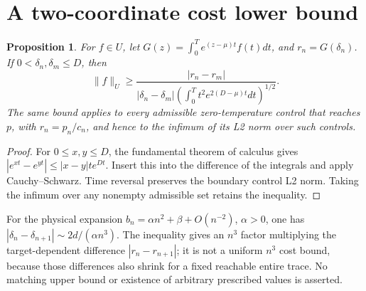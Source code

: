 \documentclass[11pt]{article}
\newtheorem{proposition}{Proposition}
\begin{document}
\section{A two-coordinate cost lower bound}
\begin{proposition}\label{prop:cost}
For \(f\in U\), let \(G(z)=\int_0^T e^{(z-\mu)t}f(t)dt\), and \(r_n=G(\delta_n)\). If \(0<\delta_n,\delta_m\le D\), then
\[
\|f\|_U\ge \frac{|r_n-r_m|}{|\delta_n-\delta_m|\left(\int_0^T t^2 e^{2(D-\mu)t}dt\right)^{1/2}}.
\]
The same bound applies to every admissible zero-temperature control that reaches \(p\), with \(r_n=p_n/c_n\), and hence to the infimum of its L2 norm over such controls.
\end{proposition}
\begin{proof}
For \(0\le x,y\le D\), the fundamental theorem of calculus gives \(|e^{xt}-e^{yt}|\le |x-y|t e^{Dt}\). Insert this into the difference of the integrals and apply Cauchy--Schwarz. Time reversal preserves the boundary control L2 norm. Taking the infimum over any nonempty admissible set retains the inequality.
\end{proof}
For the physical expansion \(b_n=\alpha n^2+\beta+O(n^{-2})\), \(\alpha>0\), one has \(|\delta_n-\delta_{n+1}|\sim2d/(\alpha n^3)\). The inequality gives an \(n^3\) factor multiplying the target-dependent difference \(|r_n-r_{n+1}|\); it is not a uniform \(n^3\) cost bound, because those differences also shrink for a fixed reachable entire trace. No matching upper bound or existence of arbitrary prescribed values is asserted.
\end{document}
